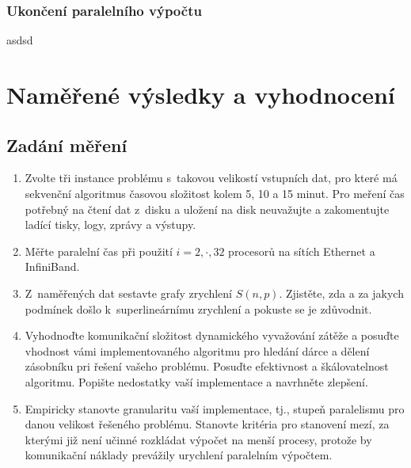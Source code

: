 \documentclass[12pt]{article}
\begin{document}
\subsubsection{Ukončení paralelního výpočtu}

asdsd

\section{Naměřené výsledky a vyhodnocení}

\subsection{Zadání měření}
\begin{enumerate}
\item Zvolte tři instance problému s~takovou velikostí vstupních dat, pro které má
sekvenční algoritmus časovou složitost kolem 5, 10 a 15 minut. Pro
meření čas potřebný na čtení dat z~disku a uložení na disk
neuvažujte a zakomentujte ladící tisky, logy, zprávy a výstupy.
\item Měřte paralelní čas při použití $i=2,\cdot,32$ procesorů na sítích Ethernet a InfiniBand.
\item Z~naměřených dat sestavte grafy zrychlení $S(n,p)$. Zjistěte, zda a za jakych podmínek
došlo k~superlineárnímu zrychlení a pokuste se je zdůvodnit.
\item Vyhodnoďte komunikační složitost dynamického vyvažování zátěže a posuďte
vhodnost vámi implementovaného algoritmu pro hledání dárce a dělení
zásobníku pri řešení vašeho problému. Posuďte efektivnost a
škálovatelnost algoritmu. Popište nedostatky vaší implementace a
navrhněte zlepšení.
\item Empiricky stanovte
granularitu vaší implementace, tj., stupeň paralelismu pro danou
velikost řešeného problému. Stanovte kritéria pro stanovení mezí, za
kterými již není učinné rozkládat výpočet na menší procesy, protože
by komunikační náklady prevážily urychlení paralelním výpočtem.
\end{enumerate}
\end{document}
